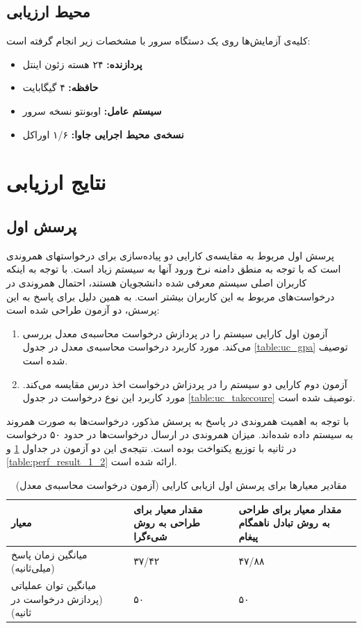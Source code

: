 \subsection{محیط ارزیابی}
کلیه‌ی آزمایش‌ها روی یک دستگاه سرور با مشخصات زیر انجام گرفته است:
\begin{itemize}
\item[] \textbf{پردازنده:} ۲۴ هسته زئون اینتل
\item[] \textbf{حافظه:} ۴ گیگابایت
\item[] \textbf{سیستم عامل:} اوبونتو نسخه سرور
\item[] \textbf{نسخه‌ی محیط اجرایی جاوا:} ۱/۶ اوراکل
\end{itemize}
\section{نتایج ارزیابی}
\subsection{پرسش اول}
پرسش اول مربوط به مقایسه‌ی  کارایی دو پیاده‌سازی برای درخواستهای همروندی است که با توجه به منطق دامنه نرخ ورود آنها به سیستم زیاد است. با توجه به اینکه کاربران اصلی سیستم معرفی شده دانشجویان هستند، احتمال همروندی در درخواست‌های مربوط به این کاربران بیشتر است. به همین دلیل برای پاسخ به این پرسش، دو آزمون طراحی شده است:
\begin{enumerate}
\item آزمون اول کارایی سیستم را در پردازش درخواست محاسبه‌ی معدل بررسی می‌کند. مورد کاربرد درخواست محاسبه‌ی معدل در جدول \ref{table:uc_gpa} توصیف شده است.
\item  آزمون دوم کارایی دو سیستم را در پردزاش درخواست اخذ درس مقایسه می‌کند. مورد کاربرد این نوع درخواست در جدول \ref{table:uc_takecoure} توصیف شده است. 
\end{enumerate}
با توجه به اهمیت همروندی در پاسخ به پرسش مذکور، درخواست‌ها به صورت همروند به سیستم داده شده‌اند. میزان همروندی در ارسال درخواست‌ها در حدود ۵۰ درخواست در ثانیه با توزیع یکنواخت بوده است. نتیجه‌ی این دو آزمون در جداول \ref{table:perf_result_1_1} و \ref{table:perf_result_1_2} ارائه شده است. 





\begin{table}[ht]
\small
\begin{center}
\begin{tabular}{|p{7cm}|p{4cm}|p{4cm}|}
	\hline
\textbf{معیار} & \textbf{مقدار معیار برای طراحی به روش شیءگرا} & \textbf{مقدار معیار برای طراحی به روش تبادل ناهمگام پیغام} 
\\ 
	\hline
	میانگین زمان پاسخ (میلی‌ثانیه)
	 &
	 ۳۷/۴۲
	 &
 ۴۷/۸۸ 
\\
	\hline
	میانگین توان عملیاتی (پردازش درخواست در ثانیه)
	 &
	 ۵۰
	 &
	 ۵۰
\\
	\hline

\end{tabular}
\caption{\label{table:perf_result_1_1} مقادیر معیارها برای پرسش اول ازیابی کارایی (آزمون درخواست محاسبه‌ی معدل)}
\end{center}
\end{table}

